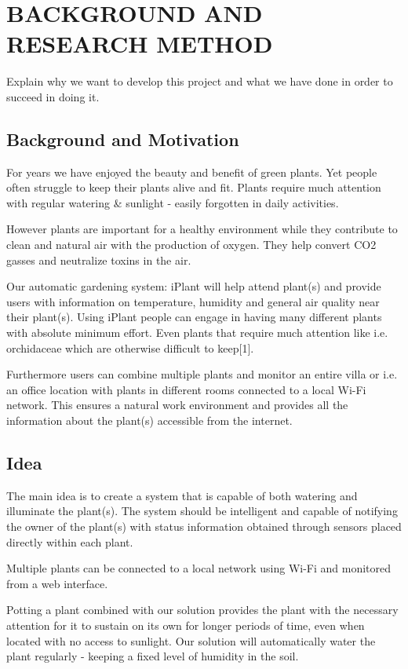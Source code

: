 \documentclass{ubicomp2012}
\begin{document}
\section{BACKGROUND AND RESEARCH METHOD}
Explain why we want to develop this project and what we have done in order to succeed in doing it.

\subsection{Background and Motivation}
For years we have enjoyed the beauty and benefit of green plants. Yet people often struggle to keep their plants alive and fit. Plants require much attention with regular watering \& sunlight - easily forgotten in daily activities.

However plants are important for a healthy environment while they contribute to clean and natural air with the production of oxygen.
They help convert CO2 gasses and neutralize toxins in the air. \cite{naturstyrelsen}

Our automatic gardening system: iPlant will help attend plant(s) and provide users with information on temperature, humidity and general air quality near their plant(s). Using iPlant people can engage in having many different plants with absolute minimum effort. Even plants that require much attention like i.e. orchidaceae which are otherwise difficult to keep[1].

Furthermore users can combine multiple plants and monitor an entire villa or i.e. an office location with plants in different rooms connected to a local Wi-Fi network. This ensures a natural work environment and provides all the information about the plant(s) accessible from the internet.

\subsection{Idea}
The main idea is to create a system that is capable of both watering and illuminate the plant(s). The system should be intelligent and capable of notifying the owner of the plant(s) with status information obtained through sensors placed directly within each plant.

Multiple plants can be connected to a local network using Wi-Fi and monitored from a web interface.

Potting a plant combined with our solution provides the plant with the necessary attention for it to sustain on its own for longer periods of time, even when located with no access to sunlight. Our solution will automatically water the plant regularly - keeping a fixed level of humidity in the soil.
\end{document}
